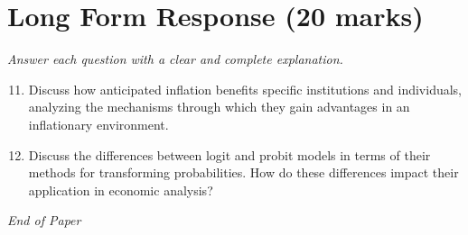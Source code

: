 \documentclass[12pt]{article}
\begin{document}
\section*{Long Form Response (20 marks)}
\textit{Answer each question with a clear and complete explanation.}
\begin{enumerate}[label=\arabic*.]
\setcounter{enumi}{10}
\item Discuss how anticipated inflation benefits specific institutions and individuals, analyzing the mechanisms through which they gain advantages in an inflationary environment.
\item Discuss the differences between logit and probit models in terms of their methods for transforming probabilities. How do these differences impact their application in economic analysis?
\end{enumerate}

\vfill
\noindent\textit{End of Paper}
\end{document}

